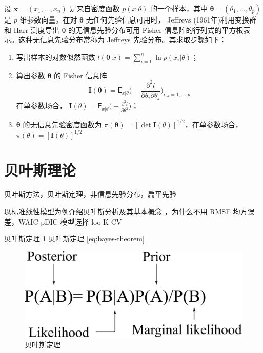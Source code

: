 \documentclass[12pt,a4paper,UTF8,twoside]{book}
\providecommand{\tightlist}{%
  \setlength{\itemsep}{0pt}\setlength{\parskip}{0pt}}
\theoremstyle{definition}
\theoremstyle{definition}
\theoremstyle{definition}
\theoremstyle{remark}
\begin{document}
设 \(\mathbf{x} = (x_1,\ldots,x_n)\) 是来自密度函数 \(p(x|\theta)\)
的一个样本，其中 \(\boldsymbol{\theta} = (\theta_1,\ldots,\theta_p)\) 是
\(p\) 维参数向量。在对 \(\boldsymbol{\theta}\) 无任何先验信息可用时，
Jeffreys (1961年)利用变换群和 Harr 测度导出 \(\boldsymbol{\theta}\)
的无信息先验分布可用 Fisher
信息阵的行列式的平方根表示。这种无信息先验分布常称为 Jeffreys
先验分布。其求取步骤如下：

\begin{enumerate}
\def\labelenumi{\arabic{enumi}.}
\tightlist
\item
  写出样本的对数似然函数
  \(l(\boldsymbol{\theta}|x) = \sum_{i=1}^{n}\ln p(x_i | \theta)\)；
\item
  算出参数 \(\boldsymbol{\theta}\) 的 Fisher 信息阵
  \[\mathbf{I}(\boldsymbol{\theta}) = \mathsf{E}_{x|\theta} \big( - \frac{\partial^2 l}{\partial \theta_i \partial \theta_j} \big)_{i,j=1,\ldots,p}\]
  在单参数场合，
  \(\mathbf{I}(\theta) = \mathsf{E}_{x|\theta} \big( - \frac{\partial^2 l}{\partial \theta^2} \big)\)；
\item
  \(\boldsymbol{\theta}\) 的无信息先验密度函数为
  \(\pi(\boldsymbol{\theta}) = [\det \mathbf{I}(\theta) ]^{1/2}\)，在单参数场合，
  \(\pi(\theta) = [\mathbf{I}(\theta) ]^{1/2}\)
\end{enumerate}

\hypertarget{bayes-methods}{%
\section{贝叶斯理论}\label{bayes-methods}}

{贝叶斯方法，贝叶斯定理，非信息先验分布，扁平先验}

以标准线性模型为例介绍贝叶斯分析及其基本概念
\citep{Rasmussen2006}，为什么不用 RMSE 均方误差，WAIC pDIC 模型选择 loo
K-CV

贝叶斯定理 \ref{fig:bayes-theorem} 贝叶斯定理 \eqref{eq:bayes-theorem}

\begin{figure}

{\centering \includegraphics[width=0.7\linewidth]{figures/bayes-theorem} 

}

\caption{贝叶斯定理}\label{fig:bayes-theorem}
\end{figure}
\end{document}
